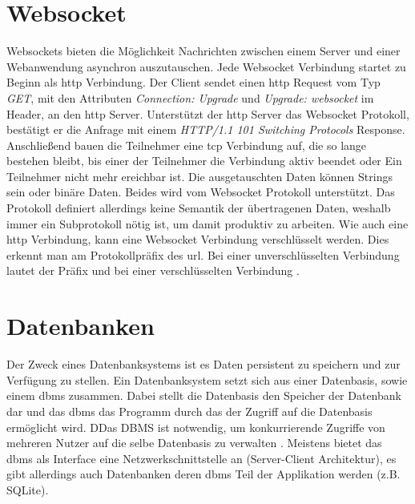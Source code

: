 \section{Websocket}
Websockets bieten die Möglichkeit Nachrichten zwischen einem Server und einer Webanwendung asynchron auszutauschen.
Jede Websocket Verbindung startet zu Beginn als \ac{http} Verbindung. 
Der Client sendet einen \ac{http} Request vom Typ \emph{GET},
mit den Attributen \emph{Connection: Upgrade} und \emph{Upgrade: websocket} im Header, an den \ac{http} Server.
Unterstützt der \ac{http} Server das Websocket Protokoll, 
bestätigt er die Anfrage mit einem \emph{HTTP/1.1 101 Switching Protocols} Response.
Anschließend bauen die Teilnehmer eine \ac{tcp} Verbindung auf, die so lange bestehen bleibt, bis einer der Teilnehmer die Verbindung aktiv beendet 
oder Ein Teilnehmer nicht mehr ereichbar ist.
Die ausgetauschten Daten können Strings sein oder binäre Daten. Beides wird vom Websocket Protokoll unterstützt.
Das Protokoll definiert allerdings keine Semantik der übertragenen Daten, 
weshalb immer ein Subprotokoll nötig ist, um damit produktiv zu arbeiten.
Wie auch eine \ac{http} Verbindung, kann eine Websocket Verbindung verschlüsselt werden. Dies erkennt man am Protokollpräfix des \ac{url}.
Bei einer unverschlüsselten Verbindung lautet der Präfix  und bei einer verschlüsselten Verbindung .

\section{Datenbanken}
Der Zweck eines Datenbanksystems ist es Daten persistent zu speichern und zur Verfügung zu stellen.
Ein Datenbanksystem setzt sich aus einer Datenbasis, sowie einem \ac{dbms} zusammen.
Dabei stellt die Datenbasis den Speicher der Datenbank dar und das \ac{dbms} 
das Programm durch das der Zugriff auf die Datenbasis ermöglicht wird.
DDas DBMS ist notwendig, um konkurrierende Zugriffe von mehreren Nutzer auf die selbe Datenbasis zu verwalten \citep{Schubert:2007:3}. 
Meistens bietet das \ac{dbms} als Interface eine Netzwerkschnittstelle an (Server-Client Architektur), es gibt allerdings auch Datenbanken deren \ac{dbms} Teil der Applikation werden (z.B. SQLite).

